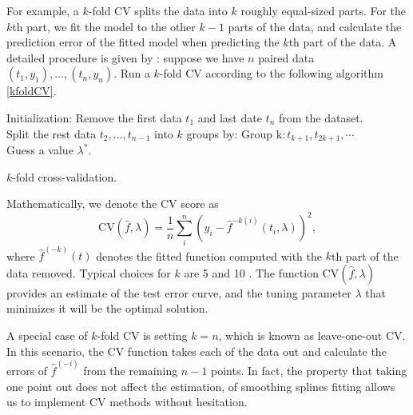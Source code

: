 For example, a $k$-fold CV splits the data into $k$ roughly equal-sized parts. For the $k$th part, we fit the model to the other $k-1$ parts
of the data, and calculate the prediction error of the fitted model when
predicting the $k$th part of the data. A detailed procedure is given by \cite{wahba1975completely}: suppose we have $n$ paired data $(t_1,y_1), \ldots, (t_n,y_n)$. Run a $k$-fold CV according to the following algorithm \ref{kfoldCV}. 
\begin{algorithm}[h]
\SetAlgoLined 
Initialization: Remove the first data $t_1$ and last date $t_n$ from the dataset. \\
Split the rest data $t_2,\ldots,t_{n-1}$ into $k$ groups by: $ \mbox{Group k} : t_{k+1}, t_{2k+1}, \cdots$ \\
Guess a value $\lambda^*$. \\
 \caption{$k$-fold cross-validation.}\label{kfoldCV}
\end{algorithm}
Mathematically, we denote the CV score as 
\begin{equation*}
\mbox{CV}(\hat{f},\lambda) = \frac{1}{n}\sum_i^n \left( y_i -\hat{f}^{-k(i)}(t_i,\lambda) \right)^2,
\end{equation*}
where $\hat{f}^{(-k)}(t)$ denotes the fitted function computed with the $k$th part of the data removed. Typical choices for $k$ are 5 and 10 \cite{esl2009}.  The function $\mbox{CV}(\hat{f},\lambda)$ provides an estimate of the test error curve, and the tuning parameter $\lambda$ that minimizes it will be the optimal solution. 

A special case of $k$-fold CV is setting $k=n$, which is known as leave-one-out CV. In this scenario, the CV function takes each of the data out and calculate the errors of $\hat{f}^{(-i)}$ from the remaining $n-1$ points. In fact, the property that taking one point out does not affect the estimation, of smoothing splines fitting allows us to implement CV methods without hesitation. 

